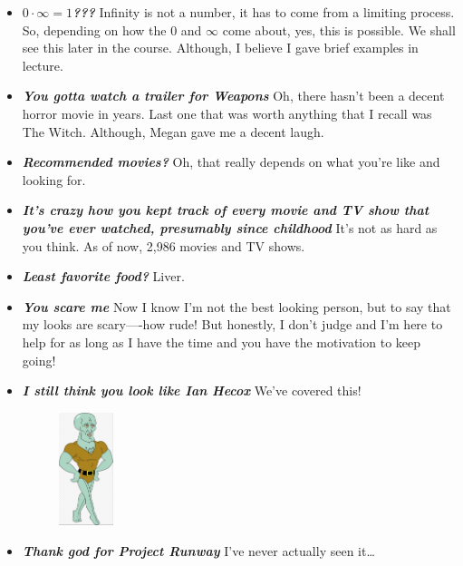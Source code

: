 \documentclass[11pt,letterpaper]{article}
\begin{document}
\begin{itemize}
\item {\bfseries\itshape $0 \cdot \infty= 1$???} Infinity is not a number, it has to come from a limiting process. So, depending on how the 0 and $\infty$ come about, yes, this is possible. We shall see this later in the course. Although, I believe I gave brief examples in lecture. 

\item {\bfseries\itshape You gotta watch a trailer for Weapons} Oh, there hasn't been a decent horror movie in years. Last one that was worth anything that I recall was The Witch. Although, Megan gave me a decent laugh. 

\item {\bfseries\itshape Recommended movies?} Oh, that really depends on what you're like and looking for. 

\item {\bfseries\itshape It's crazy how you kept track of every movie and TV show that you've ever watched, presumably since childhood} It's not as hard as you think. As of now, 2,986 movies and TV shows.

\item {\bfseries\itshape Least favorite food?} Liver.

\item {\bfseries\itshape You scare me} Now I know I'm not the best looking person, but to say that my looks are scary----how rude! But honestly, I don't judge and I'm here to help for as long as I have the time and you have the motivation to keep going!

\item {\bfseries\itshape I still think you look like Ian Hecox} We've covered this!
	\begin{figure}[H]
	\centering
	\includegraphics[width=0.15\textwidth]{images/handsomesquidward.jpg}
	\end{figure}

\item {\bfseries\itshape Thank god for Project Runway} I've never actually seen it\dots


\end{itemize}
\end{document}
